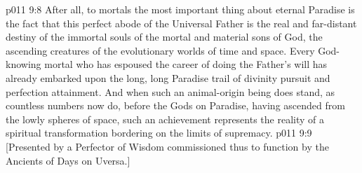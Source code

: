 \pc \vs p011 9:8 After all, to mortals the most important thing about eternal Paradise is the fact that this perfect abode of the Universal Father is the real and far\hyp{}distant destiny of the immortal souls of the mortal and material sons of God, the ascending creatures of the evolutionary worlds of time and space. Every God\hyp{}knowing mortal who has espoused the career of doing the Father’s will has already embarked upon the long, long Paradise trail of divinity pursuit and perfection attainment. And when such an animal\hyp{}origin being does stand, as countless numbers now do, before the Gods on Paradise, having ascended from the lowly spheres of space, such an achievement represents the reality of a spiritual transformation bordering on the limits of supremacy.
\vsetoff
\vs p011 9:9 [Presented by a Perfector of Wisdom commissioned thus to function by the Ancients of Days on Uversa.]
